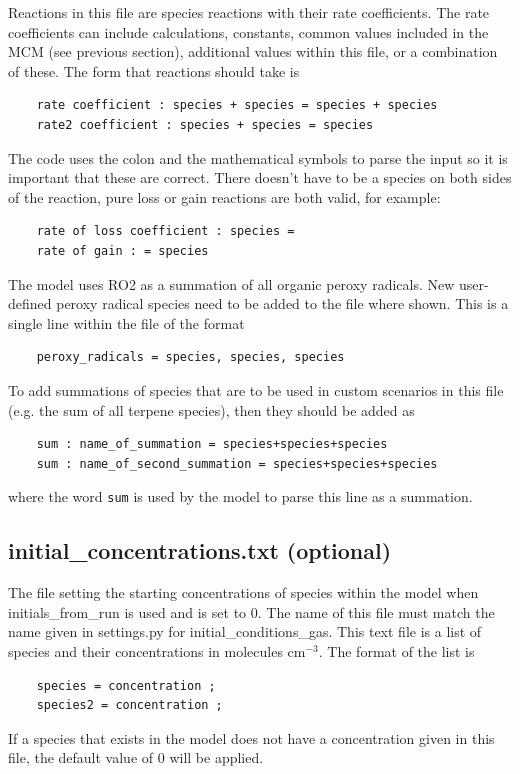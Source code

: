 \documentclass[a4paper]{refart}
\begin{document}
Reactions in this file are species reactions with their rate coefficients. The rate coefficients can include calculations, constants, common values included in the MCM (see previous section), additional values within this file, or a combination of these. The form that reactions should take is
\begin{verbatim}
    rate coefficient : species + species = species + species
    rate2 coefficient : species + species = species
\end{verbatim}
The code uses the colon and the mathematical symbols to parse the input so it is important that these are correct. There doesn't have to be a species on both sides of the reaction, pure loss or gain reactions are both valid, for example:
\begin{verbatim}
    rate of loss coefficient : species =
    rate of gain : = species
\end{verbatim}

The model uses RO2 as a summation of all organic peroxy radicals. New user-defined peroxy radical species need to be added to the file where shown. This is a single line within the file of the format
\begin{verbatim}
    peroxy_radicals = species, species, species
\end{verbatim}

To add summations of species that are to be used in custom scenarios in this file (e.g. the sum of all terpene species), then they should be added as
\begin{verbatim}
    sum : name_of_summation = species+species+species
    sum : name_of_second_summation = species+species+species
\end{verbatim}
where the word \texttt{sum} is used by the model to parse this line as a summation.

\subsection{initial\_concentrations.txt (optional)}\label{initial_concentrations.txt}
The file setting the starting concentrations of species within the model when initials\_from\_run is used and is set to 0. The name of this file must match the name given in settings.py for initial\_conditions\_gas. This text file is a list of species and their concentrations in molecules cm$^{-3}$. The format of the list is
\begin{verbatim}
    species = concentration ;
    species2 = concentration ;
\end{verbatim}
If a species that exists in the model does not have a concentration given in this file, the default value of 0 will be applied.
\end{document}
